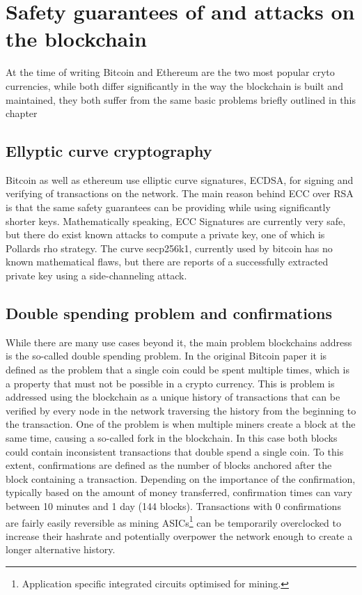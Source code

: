 \documentclass[12pt,msc,a4paper,oneside]{ucl_thesis}
\begin{document}
\chapter{Safety guarantees of and attacks on the blockchain}
At the time of writing Bitcoin and Ethereum are the two most popular cryto currencies, while both differ significantly in the way the blockchain is built and maintained, they both suffer from the same basic problems briefly outlined in this chapter

\section{Ellyptic curve cryptography}
Bitcoin as well as ethereum use elliptic curve signatures, ECDSA, for signing and verifying of transactions on the network. The main reason behind ECC over RSA is that the same safety guarantees can be providing while using significantly shorter keys. Mathematically speaking, ECC Signatures are currently very safe, but there do exist known attacks to compute a private key, one of which is Pollards rho strategy. The curve secp256k1, currently used by bitcoin has no known mathematical flaws, but there are reports of a successfully extracted private key using a side-channeling attack. \cite{EllipticCurveOverview}

\section{Double spending problem and confirmations}
While there are many use cases beyond it, the main problem blockchains address is the so-called double spending problem. In the original Bitcoin paper it is defined as the problem that a single coin could be spent multiple times, which is a property that must not be possible in a crypto currency. This is problem is addressed using the blockchain as a unique history of transactions that can be verified by every node in the network traversing the history from the beginning to the transaction. One of the problem is when multiple miners create a block at the same time, causing a so-called fork in the blockchain. In this case both blocks could contain inconsistent transactions that double spend a single coin. To this extent, confirmations are defined as the number of blocks anchored after the block containing a transaction. Depending on the importance of the confirmation, typically based on the amount of money transferred, confirmation times can vary between 10 minutes and 1 day (144 blocks). Transactions with 0 confirmations are fairly easily reversible as mining ASICs\footnote{Application specific integrated circuits optimised for mining.} can be temporarily overclocked to increase their hashrate and potentially overpower the network enough to create a longer alternative history.
\end{document}
